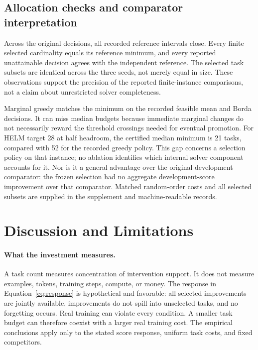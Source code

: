 \documentclass{article}
\begin{document}
\subsection{Allocation checks and comparator interpretation}
Across the original decisions, all recorded reference intervals close. Every finite selected cardinality equals its reference minimum, and every reported unattainable decision agrees with the independent reference. The selected task subsets are identical across the three seeds, not merely equal in size. These observations support the precision of the reported finite-instance comparisons, not a claim about unrestricted solver completeness.

Marginal greedy matches the minimum on the recorded feasible mean and Borda decisions. It can miss median budgets because immediate marginal changes do not necessarily reward the threshold crossings needed for eventual promotion. For HELM target 28 at half headroom, the certified median minimum is 21 tasks, compared with 52 for the recorded greedy policy. This gap concerns a selection policy on that instance; no ablation identifies which internal solver component accounts for it. Nor is it a general advantage over the original development comparator: the frozen selection had no aggregate development-score improvement over that comparator. Matched random-order costs and all selected subsets are supplied in the supplement and machine-readable records.

\section{Discussion and Limitations}
\paragraph{What the investment measures.}
A task count measures concentration of intervention support. It does not measure examples, tokens, training steps, compute, or money. The response in Equation~\eqref{eq:response} is hypothetical and favorable: all selected improvements are jointly available, improvements do not spill into unselected tasks, and no forgetting occurs. Real training can violate every condition. A smaller task budget can therefore coexist with a larger real training cost. The empirical conclusions apply only to the stated score response, uniform task costs, and fixed competitors.
\end{document}
